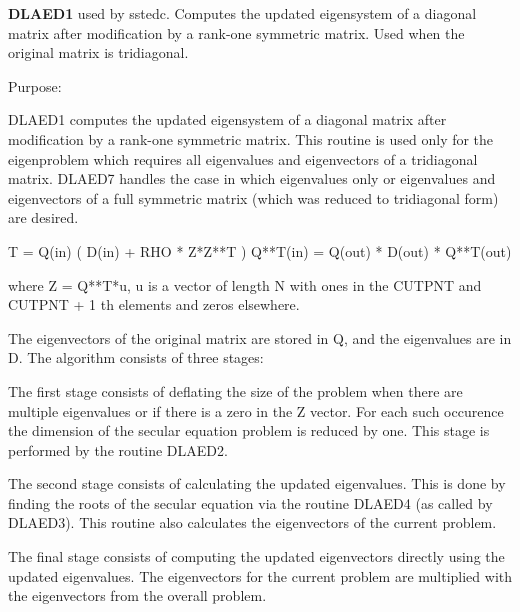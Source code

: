 {\bfseries D\+L\+A\+E\+D1} used by sstedc. Computes the updated eigensystem of a diagonal matrix after modification by a rank-\/one symmetric matrix. Used when the original matrix is tridiagonal. 

 \begin{DoxyParagraph}{Purpose\+: }
\begin{DoxyVerb} DLAED1 computes the updated eigensystem of a diagonal
 matrix after modification by a rank-one symmetric matrix.  This
 routine is used only for the eigenproblem which requires all
 eigenvalues and eigenvectors of a tridiagonal matrix.  DLAED7 handles
 the case in which eigenvalues only or eigenvalues and eigenvectors
 of a full symmetric matrix (which was reduced to tridiagonal form)
 are desired.

   T = Q(in) ( D(in) + RHO * Z*Z**T ) Q**T(in) = Q(out) * D(out) * Q**T(out)

    where Z = Q**T*u, u is a vector of length N with ones in the
    CUTPNT and CUTPNT + 1 th elements and zeros elsewhere.

    The eigenvectors of the original matrix are stored in Q, and the
    eigenvalues are in D.  The algorithm consists of three stages:

       The first stage consists of deflating the size of the problem
       when there are multiple eigenvalues or if there is a zero in
       the Z vector.  For each such occurence the dimension of the
       secular equation problem is reduced by one.  This stage is
       performed by the routine DLAED2.

       The second stage consists of calculating the updated
       eigenvalues. This is done by finding the roots of the secular
       equation via the routine DLAED4 (as called by DLAED3).
       This routine also calculates the eigenvectors of the current
       problem.

       The final stage consists of computing the updated eigenvectors
       directly using the updated eigenvalues.  The eigenvectors for
       the current problem are multiplied with the eigenvectors from
       the overall problem.\end{DoxyVerb}
 
\end{DoxyParagraph}


